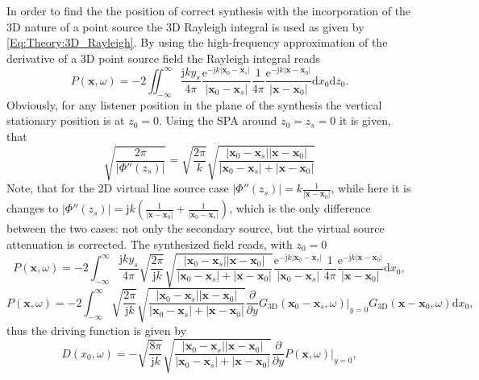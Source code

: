 \documentclass[12pt,a4paper]{article}
\newcommand{\td}{\mathrm{d}}
\newcommand{\te}{\mathrm{e}}
\newcommand{\ti}{\mathrm{j}}
\newcommand{\vx}{\mathbf{x}}
\newcommand{\vxo}{\mathbf{x}_0}
\begin{document}
In order to find the the position of correct synthesis with the incorporation of the 3D nature of a point source the 3D Rayleigh integral is used as given by \eqref{Eq:Theory:3D_Rayleigh}. By using the high-frequency approximation of the derivative of a 3D point source field the Rayleigh integral reads
\begin{equation}
P(\vx,\omega) = -2 \iint_{-\infty}^{\infty} \frac{\ti k y_s}{4\pi} \frac{\te^{-\ti k | \vxo - \mathbf{x}_s | }}{|\vxo - \mathbf{x}_s|} \frac{1}{4\pi} \frac{\te^{-\ti k | \vx - \vxo| }}{ | \vx - \vxo| } \td x_0 \td z_0.
\end{equation}
Obviously, for any listener position in the plane of the synthesis the vertical stationary position is at $z_0=0$. Using the SPA around $z_0 = z_s = 0$ it is given, that
\begin{equation}
\sqrt{\frac{2\pi}{|\Phi''(z_s)|}} = \sqrt{\frac{2\pi}{ k }}\sqrt{\frac{| \vxo - \mathbf{x}_s | | \vx - \vxo|  }{| \vxo - \mathbf{x}_s | + | \vx - \vxo| }}
\end{equation}
Note, that for the 2D virtual line source case $|\Phi''(z_s)| = k \frac{1}{ |\vx - \vxo| }$, while here it is changes to $|\Phi''(z_s)| = \ti k \left( \frac{1}{| \vx - \vxo|} + \frac{1}{ |\vxo - \mathbf{x}_s |} \right)$, which is the only difference between the two cases: not only the secondary source, but the virtual source attenuation is corrected.
The synthesized field reads, with $z_0=0$
\begin{equation}
P(\vx,\omega) = -2 \int_{-\infty}^{\infty} \frac{\ti k y_s}{4\pi} \sqrt{\frac{2\pi}{\ti k}}\sqrt{\frac{| \vxo - \mathbf{x}_s | | \vx - \vxo|  }{| \vxo - \mathbf{x}_s | + | \vx - \vxo| }} \frac{\te^{-\ti k | \vxo - \mathbf{x}_s | }}{|\vxo - \mathbf{x}_s|} \frac{1}{4\pi} \frac{\te^{-\ti k | \vx - \vxo| }}{ | \vx - \vxo| } \td x_0,
\end{equation}	
\begin{equation}
P(\vx,\omega) = -2 \int_{-\infty}^{\infty}  \sqrt{\frac{2\pi}{\ti k}}\sqrt{\frac{| \vxo - \mathbf{x}_s | | \vx - \vxo|  }{| \vxo - \mathbf{x}_s | + | \vx - \vxo| }} \frac{\partial}{\partial y} \left. G_{3\mathrm{D}}(\vxo - \mathbf{x}_s,\omega) \right|_{y = 0}   G_{3\mathrm{D}}(\vx - \vxo,\omega) \td x_0,
\end{equation}
thus the driving function is given by
\begin{equation}
D(x_0,\omega) = 
- \sqrt{\frac{8\pi}{\ti k}} \sqrt{\frac{| \vxo - \mathbf{x}_s | | \vx - \vxo|  }{| \vxo - \mathbf{x}_s | + | \vx - \vxo| }} \frac{\partial}{\partial y} \left. P(\vx,\omega) \right|_{y = 0},
\label{Eq:2_5D_point_source_implicit_df}
\end{equation}
\end{document}
